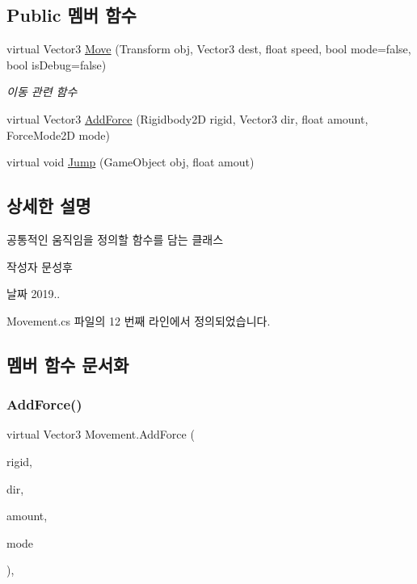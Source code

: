 \subsection*{Public 멤버 함수}
\begin{DoxyCompactItemize}
\item 
virtual Vector3 \mbox{\hyperlink{class_movement_ad400f155e0556a5e22a74cb77858460a}{Move}} (Transform obj, Vector3 dest, float speed, bool mode=false, bool is\+Debug=false)
\begin{DoxyCompactList}\small\item\em 이동 관련 함수 \end{DoxyCompactList}\item 
virtual Vector3 \mbox{\hyperlink{class_movement_ab0b20a2f058e2eed15f4bdf0503a2566}{Add\+Force}} (Rigidbody2D rigid, Vector3 dir, float amount, Force\+Mode2D mode)
\item 
virtual void \mbox{\hyperlink{class_movement_a496c630807c87a286fb53070b4ed6cf1}{Jump}} (Game\+Object obj, float amout)
\end{DoxyCompactItemize}


\subsection{상세한 설명}
공통적인 움직임을 정의할 함수를 담는 클래스 

\begin{DoxyAuthor}{작성자}
문성후 
\end{DoxyAuthor}
\begin{DoxyDate}{날짜}
2019.. 
\end{DoxyDate}


Movement.\+cs 파일의 12 번째 라인에서 정의되었습니다.



\subsection{멤버 함수 문서화}
\mbox{\label{class_movement_ab0b20a2f058e2eed15f4bdf0503a2566}} 
\subsubsection{\texorpdfstring{AddForce()}{AddForce()}}
{\footnotesize\ttfamily virtual Vector3 Movement.\+Add\+Force (\begin{DoxyParamCaption}\item[{Rigidbody2D}]{rigid,  }\item[{Vector3}]{dir,  }\item[{float}]{amount,  }\item[{Force\+Mode2D}]{mode }\end{DoxyParamCaption})\hspace{0.3cm}{\ttfamily [inline]}, {\ttfamily [virtual]}}



